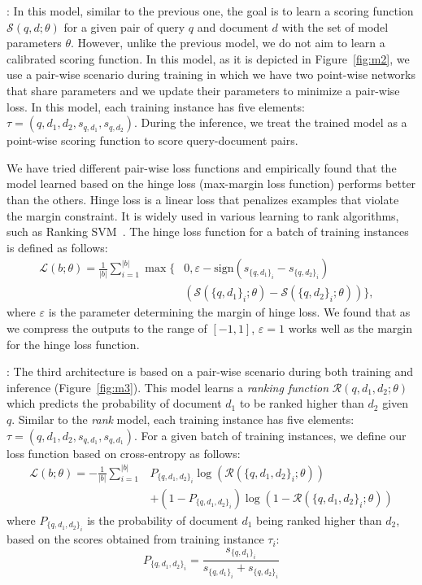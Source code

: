 \documentclass[sigconf]{acmart}
\newcommand{\Modeltwo}{Rank model\xspace}
\newcommand{\Modelthree}{Rank\-Prob model\xspace}
\newcommand{\modeltwo}{\textit{rank} model\xspace}
\begin{document}
\mypar{\Modeltwo}:
In this model, similar to the previous one, the goal is to learn a scoring function $\mathcal{S}(q, d; \theta)$ for a given pair of query $q$ and document $d$ with the set of model parameters $\theta$. 
However, unlike the previous model, we do not aim to learn a calibrated scoring function. 
In this model, as it is depicted in Figure~\ref{fig:m2}, we use a pair-wise scenario during training in which we have two point-wise networks that share parameters and we update their parameters to minimize a pair-wise loss.
In this model, each training instance has five elements: $\tau = (q,d_1, d_2, s_{q,d_1}, s_{q,d_2})$.
During the inference, we treat the trained model as a point-wise scoring function to score query-document pairs.

We have tried different pair-wise loss functions and empirically found that the model learned based on the hinge loss (max-margin loss function) performs better than the others. 
Hinge loss is a linear loss that penalizes examples that violate the margin constraint. It is widely used in various learning to rank algorithms, such as Ranking SVM~\citep{Herbrich:1999}. The hinge loss function for a batch of training instances is defined as follows:
\begin{equation}
\begin{aligned}
\mathcal{L}(b; \theta) = \frac{1}{|b|}
\sum_{i=1}^{|b|}
\max\big\{
& 
0, \varepsilon - \text{sign}
(s_{\{q, d_1\}_i} - s_{\{q, d_2\}_i})
& \\ & 
\left(\mathcal{S}\left(\{q, d_1\}_i; \theta\right) -\mathcal{S}\left(\{q, d_2\}_i; \theta\right)\right)
\big\}
, 
\end{aligned}     
\end{equation}
where $\varepsilon$ is the parameter determining the margin of hinge loss. We found that as we compress the outputs to the range of $[-1, 1]$, $\varepsilon=1$ works well as the margin for the hinge loss function.

\mypar{\Modelthree}:
The third architecture is based on a pair-wise scenario during both training and inference (Figure~\ref{fig:m3}). This model learns a \emph{ranking function} $\mathcal{R}(q, d_1, d_2; \theta)$ which predicts the probability of document $d_1$ to be ranked higher than $d_2$ given $q$.
Similar to the \modeltwo, each training instance has five elements: $\tau = (q,d_1, d_2, s_{q,d_1}, s_{q,d_1})$.
For a given batch of training instances, we define our loss function based on cross-entropy as follows:
\begin{align}
\mathcal{L}(b; \theta) = -\frac{1}{|b|}
\sum_{i=1}^{|b|} &
P_{\{q,d_1,d_2\}_i} \log(\mathcal{R}(\{q,d_1,d_2\}_i; \theta)) \\
&
+ (1- P_{\{q,d_1,d_2\}_i})\log(1- \mathcal{R}(\{q,d_1,d_2\}_i; \theta)) \nonumber
\end{align}
where $P_{\{q,d_1,d_2\}_i}$ is the probability of document $d_1$ being ranked higher than $d_2$, based on the scores obtained from training instance $\tau_i$:
\begin{equation}
P_{\{q,d_1,d_2\}_i} = \frac{s_{\{q,d_1\}_i}}{s_{\{q,d_1\}_i} + s_{\{q,d_2\}_i}}
\end{equation}
\end{document}
